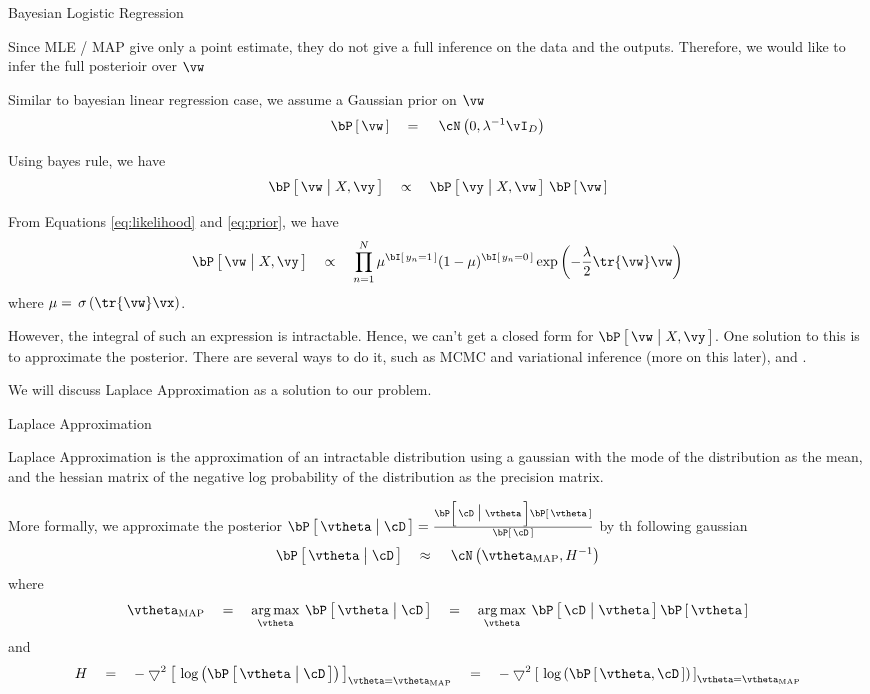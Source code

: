 \documentclass{article}
\begin{document}
\begin{ssection}{Bayesian Logistic Regression}

	Since MLE / MAP give only a point estimate, they do not give a full inference on the data and the outputs. Therefore, we would like to infer the full posterioir over $\vw$

	Similar to bayesian linear regression case, we assume a Gaussian prior on $\vw$
	\begin{equation}
		\prob{\vw}	\eq \ND{0, \lambda^{-1} \vI_D}
		\label{eq:prior}
	\end{equation}

	Using bayes rule, we have
	\begin{align*}
		\prob{\vw \pipe X, \vy}	\qprop	\prob{\vy \pipe X, \vw} \, \prob{\vw}
	\end{align*}

	From Equations \ref{eq:likelihood} and \ref{eq:prior}, we have
	\begin{align*}
		\prob{\vw \pipe X, \vy}	\qprop	\prod_{n = 1}^N \mu^{\is{y_n = 1}} (1 - \mu)^{\is{y_n = 0}} \texp{- \frac{\lambda}{2} \tr{\vw} \vw}
	\end{align*}
	where $\mu = \sigmoid{\tr{\vw} \vx}$.

	However, the integral of such an expression is intractable. Hence, we can't get a closed form for $\prob{\vw \pipe X, \vy}$. One solution to this is to approximate the posterior. There are several ways to do it, such as MCMC and variational inference (more on this later), and .

	We will discuss Laplace Approximation as a solution to our problem.

	\begin{ssubsection}{Laplace Approximation}

		Laplace Approximation is the approximation of an intractable distribution using a gaussian with the mode of the distribution as the mean, and the hessian matrix of the negative log probability of the distribution as the precision matrix.

		More formally, we approximate the posterior $\prob{\vtheta \pipe \cD} = \frac{\prob{\cD \pipe \vtheta} \prob{\vtheta}}{\prob{\cD}}$ by th following gaussian
		\begin{align*}
			\prob{\vtheta \pipe \cD}	\qapprox	\ND{\vtheta_{\text{MAP}}, H^{-1}}
		\end{align*}
		where
		\begin{align*}
			\vtheta_{\text{MAP}}	\eq	\argmax{\vtheta} \prob{\vtheta \pipe \cD}	\eq	\argmax{\vtheta} \prob{\cD \pipe \vtheta} \prob{\vtheta}
		\end{align*}
		and
		\begin{align*}
		H	\eq	- \bigtriangledown^2 \brac{\log{\prob{\vtheta \pipe \cD}}}_{\vtheta = \vtheta_{\text{MAP}}}	\eq	- \bigtriangledown^2 \brac{\log{\prob{\vtheta, \cD}}}_{\vtheta = \vtheta_{\text{MAP}}}
		\end{align*}


\end{ssubsection}
\end{ssection}
\end{document}
